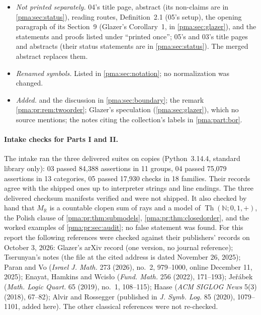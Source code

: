 \documentclass[11pt]{article}
\numberwithin{equation}{section}
\theoremstyle{definition}
\theoremstyle{remark}
\newcommand{\N}{\mathbb N}
\newcommand{\R}{\mathbb R}
\newcommand{\MR}{M_{\R}}
\newcommand{\Th}{\operatorname{Th}}
\begin{document}
\begin{itemize}
printed as delivered. Part~I has seventeen questions, Part~II eight.
\item \emph{Not printed separately.} 04's title page, abstract (its
non-claims are in \cref{pma:sec:status}), reading routes, Definition~2.1
(05's setup), the opening paragraph of its Section~9 (Glazer's Corollary~1,
in \cref{pma:sec:glazer}), and the statements and proofs listed under
``printed once''; 05's and 03's title pages and abstracts (their status
statements are in \cref{pma:sec:status}). The merged abstract replaces them.
\item \emph{Renamed symbols.} Listed in \cref{pma:sec:notation}; no
normalization was changed.
\item \emph{Added.}  and the discussion in
\cref{pma:sec:boundary}; the remark \cref{pma:pr:rem:twoorder}; Glazer's
speculation (\cref{pma:sec:glazer}), which no source mentions; the notes
citing the collection's labels in \cref{pma:part:bor}.
\end{itemize}

\paragraph{Intake checks for Parts I and II.} The intake ran the three delivered suites on
copies (Python~3.14.4, standard library only): 03 passed 84{,}388 assertions
in 11 groups, 04 passed 75{,}079 assertions in 13 categories, 05 passed
17{,}930 checks in 18 families. Their records agree with the shipped ones up to
interpreter strings and line endings. The three delivered checksum manifests
verified and were not shipped. It also checked by hand that $\MR$ is a
countable clopen sum of rays and a model of $\Th(\N;0,1,+)$, the Polish clause
of \cref{pma:pr:thm:submodels}, \cref{pma:pr:thm:closedorder}, and the worked
examples of \cref{pma:pr:sec:audit}; no false statement was found. For this
report the following references were checked against their publishers'
records on October 3, 2026: Glazer's arXiv record (one version, no journal
reference); Tserunyan's notes (the file at the cited address is dated
November 26, 2025); Paran and Vo (\emph{Israel J. Math.} 273 (2026), no.~2,
979--1000, online December 11, 2025); Enayat, Hamkins and Wcis\l o
(\emph{Fund. Math.} 256 (2022), 171--193); Je\v r\'abek (\emph{Math. Logic
Quart.} 65 (2019), no.~1, 108--115); Haase (\emph{ACM SIGLOG News} 5(3) (2018),
67--82); Alvir and Rossegger (published in \emph{J. Symb. Log.} 85 (2020),
1079--1101, added here). The other classical references were not re-checked.
\end{document}

